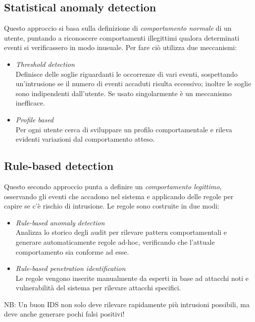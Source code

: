 \documentclass[a4paper, 11pt, twoside, openright, fleqn]{report}
\begin{document}
\subsection{Statistical anomaly detection}
Questo approccio si basa sulla definizione di \emph{comportamento normale} di un utente, puntando a riconoscere comportamenti illegittimi qualora determinati eventi si verificassero in modo inusuale.
Per fare ciò utilizza due meccanismi:
\begin{itemize}
	\item \emph{Threshold detection}\\
	Definisce delle soglie riguardanti le occorrenze di vari eventi, sospettando un'intrusione se il numero di eventi accaduti risulta eccessivo; inoltre le soglie sono indipendenti dall'utente. Se usato singolarmente è un meccanismo inefficace.
	\item \emph{Profile based}\\
	Per ogni utente cerca di sviluppare un profilo comportamentale e rileva evidenti variazioni dal comportamento atteso.
\end{itemize}

\subsection{Rule-based detection}
Questo secondo approccio punta a definire un \emph{comportamento legittimo}, osservando gli eventi che accadono nel sistema e applicando delle regole per capire se c'è rischio di intrusione. Le regole sono costruite in due modi:
\begin{itemize}
	\item \emph{Rule-based anomaly detection}\\
	Analizza lo storico degli audit per rilevare pattern comportamentali e generare automaticamente regole ad-hoc, verificando che l'attuale comportamento sia conforme ad esse.
	\item \emph{Rule-based penetration identification}\\
	Le regole vengono inserite manualmente da esperti in base ad attacchi noti e vulnerabilità del sistema per rilevare attacchi specifici.
\end{itemize}

\noindent
NB: Un buon IDS non solo deve rilevare rapidamente più intrusioni possibili, ma deve anche generare pochi falsi positivi! 
\end{document}
